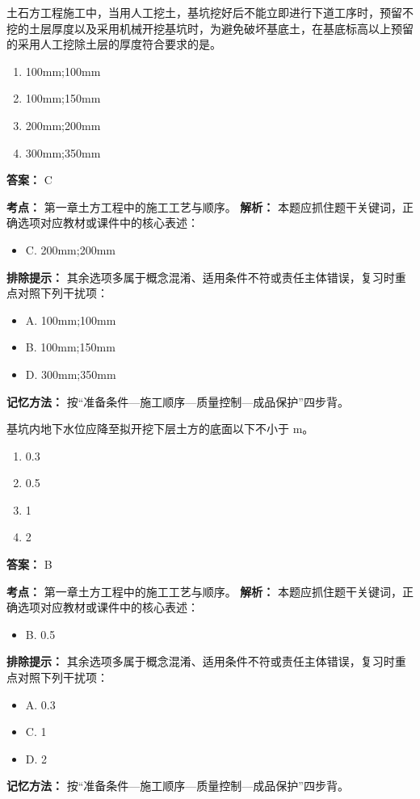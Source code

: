 \documentclass[UTF8,fontset=fandol,11pt]{ctexart}
\begin{document}
\begin{quizbox}[title={第 15 题}]
土石方工程施工中，当用人工挖土，基坑挖好后不能立即进行下道工序时，预留不挖的土层厚度以及采用机械开挖基坑时，为避免破坏基底土，在基底标高以上预留的采用人工挖除土层的厚度符合要求的是。\\
\begin{enumerate}[label=\Alph*.]
\item 100mm;100mm
\item 100mm;150mm
\item 200mm;200mm
\item 300mm;350mm
\end{enumerate}
\textbf{答案：} C
\vspace{0.25em}
\begin{answerbox}[title={考点解析}]
\textbf{考点：} 第一章土方工程中的施工工艺与顺序。
\textbf{解析：} 本题应抓住题干关键词，正确选项对应教材或课件中的核心表述：
\begin{itemize}
\item C. 200mm;200mm
\end{itemize}
\textbf{排除提示：} 其余选项多属于概念混淆、适用条件不符或责任主体错误，复习时重点对照下列干扰项：
\begin{itemize}
\item A. 100mm;100mm
\item B. 100mm;150mm
\item D. 300mm;350mm
\end{itemize}
\textbf{记忆方法：} 按“准备条件—施工顺序—质量控制—成品保护”四步背。
\end{answerbox}
\end{quizbox}

\begin{quizbox}[title={第 16 题}]
基坑内地下水位应降至拟开挖下层土方的底面以下不小于 m。\\
\begin{enumerate}[label=\Alph*.]
\item 0.3
\item 0.5
\item 1
\item 2
\end{enumerate}
\textbf{答案：} B
\vspace{0.25em}
\begin{answerbox}[title={考点解析}]
\textbf{考点：} 第一章土方工程中的施工工艺与顺序。
\textbf{解析：} 本题应抓住题干关键词，正确选项对应教材或课件中的核心表述：
\begin{itemize}
\item B. 0.5
\end{itemize}
\textbf{排除提示：} 其余选项多属于概念混淆、适用条件不符或责任主体错误，复习时重点对照下列干扰项：
\begin{itemize}
\item A. 0.3
\item C. 1
\item D. 2
\end{itemize}
\textbf{记忆方法：} 按“准备条件—施工顺序—质量控制—成品保护”四步背。
\end{answerbox}
\end{quizbox}
\end{document}
